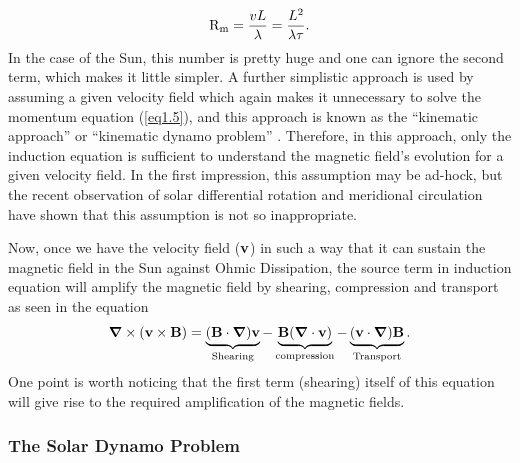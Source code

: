 \begin{equation}
{\rm R_m}=   \frac{vL}{\lambda}=\frac{L^2}{\lambda \tau}.
\label{eq1.9}
\end{equation}
In the case of the Sun, this number is pretty huge and one can ignore the second term, which makes it little simpler. A further simplistic approach is used by assuming a given velocity field which again makes it unnecessary to solve the momentum equation (\autoref{eq1.5}), and this approach is known as the ``kinematic approach'' or ``kinematic dynamo problem'' \citep{Karak2014}. Therefore, in this approach, only the induction equation is sufficient to understand the magnetic field's evolution for a given velocity field. In the first impression, this assumption may be ad-hock, but the recent observation of solar differential rotation and meridional circulation \citep{Dalsgaard2002} have shown that this assumption is not so inappropriate. 

Now, once we have the velocity field ($\vb{v}$) in such a way that it can sustain the magnetic field in the Sun against Ohmic Dissipation, the source term in induction equation will amplify the magnetic field by shearing, compression and transport as seen in the equation
\begin{equation}
    \bm{\nabla}\times(\vb{v}\times\vb{B})=\underbrace{(\vb{B}\cdot\bm{\nabla})\vb{v}}_{\text{Shearing}}-\underbrace{\vb{B}(\bm{\nabla}\cdot\vb{v})}_{\text{compression}}-\underbrace{(\vb{v}\cdot\bm{\nabla})\vb{B}}_{\text{Transport}}.
    \label{eq1.10}
\end{equation}
One point is worth noticing that the first term (shearing) itself of this equation will give rise to the required amplification of the magnetic fields.


\subsubsection*{The Solar Dynamo Problem}
\vspace{-0.7cm}

